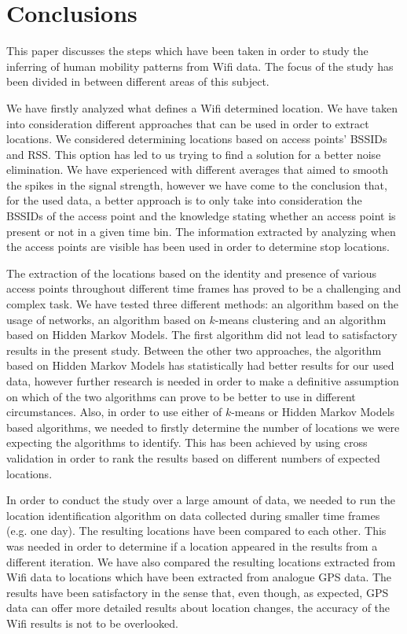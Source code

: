 \chapter{Conclusions}

This paper discusses the steps which have been taken in order to study the
inferring of human mobility patterns from Wifi data. The focus of the study has
been divided in between different areas of this subject. 

We have firstly analyzed what defines a Wifi determined location. We have taken
into consideration different approaches that can be used in order to extract
locations. We considered determining locations based on access points' BSSIDs
and RSS. This option has led to us trying to find a solution for a better noise
elimination. We have experienced with different averages that aimed to smooth
the spikes in the signal strength, however we have come to the conclusion that,
for the used data, a better approach is to only take into consideration the
BSSIDs of the access point and the knowledge stating whether an access point is
present or not in a given time bin. The information extracted by analyzing when the access
points are visible has been used in order to determine stop locations.

The extraction of the locations based on the identity and presence of various
access points throughout different time frames has proved to be a challenging
and complex task. We have tested three different methods: an algorithm based on
the usage of networks, an algorithm based on $k$-means clustering and an
algorithm based on Hidden Markov Models. The first algorithm did not lead to
satisfactory results in the present study. Between the other two approaches,
the algorithm based on Hidden Markov Models has statistically had better results
for our used data, however further research is needed in order to make a
definitive assumption on which of the two algorithms can prove to be better to
use in different circumstances. Also, in order to use either of $k$-means or
Hidden Markov Models based algorithms, we needed to firstly determine the number
of locations we were expecting the algorithms to identify. This has been achieved
by using cross validation in order to rank the results based on different
numbers of expected locations.

In order to conduct the study over a large amount of data, we needed to run the
location identification algorithm on data collected during smaller time frames
(e.g. one day). The resulting locations have been compared to each other. This
was needed in order to determine if a location appeared in the results from a
different iteration. We have also compared the resulting locations extracted
from Wifi data to locations which have been extracted from analogue GPS data.
The results have been satisfactory in the sense that, even though, as expected,
GPS data can offer more detailed results about location changes, the accuracy
of the Wifi results is not to be overlooked.

